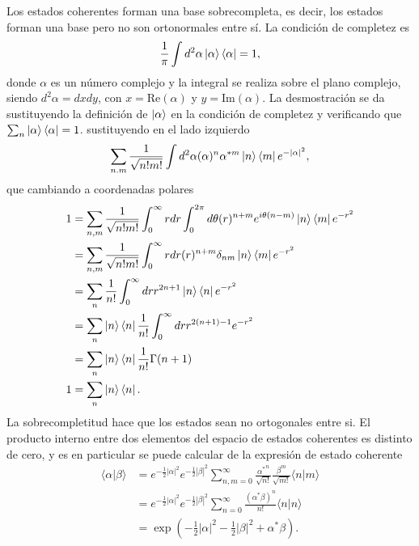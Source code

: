Los estados coherentes forman una base sobrecompleta, es decir, los estados forman una base pero no son ortonormales entre sí. La condición de completez es
\begin{equation}
  \frac{1}{\pi}\int d^2 \alpha \ket{\alpha}\bra{\alpha} = 1,
\end{equation}
donde $\alpha$ es un número complejo y la integral se realiza sobre el plano complejo, siendo $d^2\alpha = dxdy$, con $x = \mathrm{Re}(\alpha)$ y $y = \mathrm{Im}(\alpha)$. La desmostración se da sustituyendo la definición de $\ket{\alpha}$ en la condición de completez y verificando que $\sum_n \ket{\alpha}\bra{\alpha}=1$. sustituyendo en el lado izquierdo
\begin{equation}
  \sum_{n.m} \frac{1}{\sqrt{n!m!}}\int d^2\alpha (\alpha)^n \alpha^{*m}\ket{n}\bra{m}e^{-|\alpha|^2},
\end{equation}
que cambiando a coordenadas polares
\begin{align}
  1 & = \sum_{n,m}\frac{1}{\sqrt{n!m!}}\int_0^{\infty} rdr \int_{0}^{2\pi}d\theta (r)^{n+m}e^{i\theta(n-m)}\ket{n}\bra{m}e^{-r^2} \\ & = \sum_{n,m}\frac{1}{\sqrt{n!m!}}\int_0^{\infty} rdr  (r)^{n+m} \delta_{nm} \ket{n}\bra{m}e^{-r^2} \\
    & = \sum_{n}\frac{1}{n!}\int_0^{\infty} dr  r^{2n+1} \ket{n}\bra{n}e^{-r^2}                                                   \\
    & = \sum_{n} \ket{n}\bra{n} \frac{1}{n!}\int_0^{\infty} dr  r^{2(n+1)-1} e^{-r^2}                                             \\
    & = \sum_{n} \ket{n}\bra{n} \frac{1}{n!} \Gamma(n+1)                                                                          \\
  1 & = \sum_{n} \ket{n}\bra{n}.
\end{align}
La sobrecompletitud hace que los estados sean no ortogonales entre si. El producto interno entre dos elementos del espacio de estados coherentes es distinto de cero, y es en particular se puede calcular de la expresión de estado coherente
\begin{align}
  \langle\alpha\vert\beta\rangle & = e^{-\frac{1}{2}|\alpha|^2} e^{-\frac{1}{2}|\beta|^2} \sum_{n,m=0}^{\infty} \frac{{\alpha^*}^n}{\sqrt{n!}}\frac{\beta^m}{\sqrt{m!}} \langle n\vert m \rangle \\
                                 & = e^{-\frac{1}{2}|\alpha|^2} e^{-\frac{1}{2}|\beta|^2} \sum_{n=0}^{\infty} \frac{{(\alpha^*\beta)}^n}{n!} \langle n \vert n\rangle                            \\
                                 & = \exp{\left( - \frac{1}{2}|\alpha|^2 - \frac{1}{2}|\beta|^2 + \alpha^*\beta \right)}.
\end{align}
